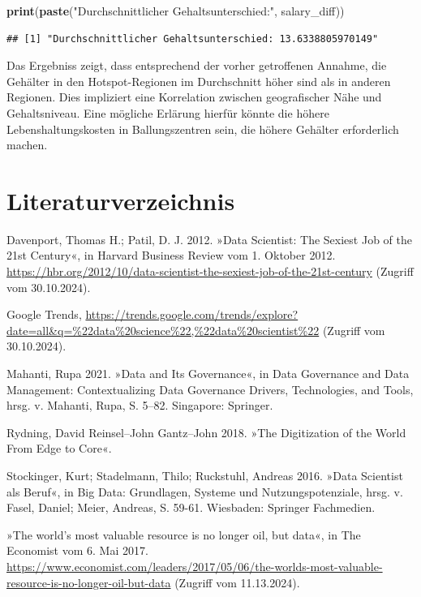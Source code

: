 \documentclass[
]{article}
\newenvironment{Shaded}{\begin{snugshade}}{\end{snugshade}}
\newcommand{\FunctionTok}[1]{\textcolor[rgb]{0.13,0.29,0.53}{\textbf{#1}}}
\newcommand{\NormalTok}[1]{#1}
\newcommand{\StringTok}[1]{\textcolor[rgb]{0.31,0.60,0.02}{#1}}
\begin{document}
\begin{Shaded}
\begin{Highlighting}[]
\FunctionTok{print}\NormalTok{(}\FunctionTok{paste}\NormalTok{(}\StringTok{"Durchschnittlicher Gehaltsunterschied:"}\NormalTok{, salary\_diff))}
\end{Highlighting}
\end{Shaded}

\begin{verbatim}
## [1] "Durchschnittlicher Gehaltsunterschied: 13.6338805970149"
\end{verbatim}

Das Ergebniss zeigt, dass entsprechend der vorher getroffenen Annahme,
die Gehälter in den Hotspot-Regionen im Durchschnitt höher sind als in
anderen Regionen. Dies impliziert eine Korrelation zwischen
geografischer Nähe und Gehaltsniveau. Eine mögliche Erlärung hierfür
könnte die höhere Lebenshaltungskosten in Ballungszentren sein, die
höhere Gehälter erforderlich machen.

\newpage

\section{Literaturverzeichnis}\label{literaturverzeichnis}

Davenport, Thomas H.; Patil, D. J. 2012. »Data Scientist: The Sexiest
Job of the 21st Century«, in Harvard Business Review vom 1. Oktober
2012.
\url{https://hbr.org/2012/10/data-scientist-the-sexiest-job-of-the-21st-century}
(Zugriff vom 30.10.2024).

Google Trends,
\url{https://trends.google.com/trends/explore?date=all&q=\%22data\%20science\%22,\%22data\%20scientist\%22}
(Zugriff vom 30.10.2024).

Mahanti, Rupa 2021. »Data and Its Governance«, in Data Governance and
Data Management: Contextualizing Data Governance Drivers, Technologies,
and Tools, hrsg. v. Mahanti, Rupa, S. 5--82. Singapore: Springer.

Rydning, David Reinsel--John Gantz--John 2018. »The Digitization of the
World From Edge to Core«.

Stockinger, Kurt; Stadelmann, Thilo; Ruckstuhl, Andreas 2016. »Data
Scientist als Beruf«, in Big Data: Grundlagen, Systeme und
Nutzungspotenziale, hrsg. v. Fasel, Daniel; Meier, Andreas, S. 59-61.
Wiesbaden: Springer Fachmedien.

»The world's most valuable resource is no longer oil, but data«, in The
Economist vom 6. Mai 2017.
\url{https://www.economist.com/leaders/2017/05/06/the-worlds-most-valuable-resource-is-no-longer-oil-but-data}
(Zugriff vom 11.13.2024).


\end{document}

